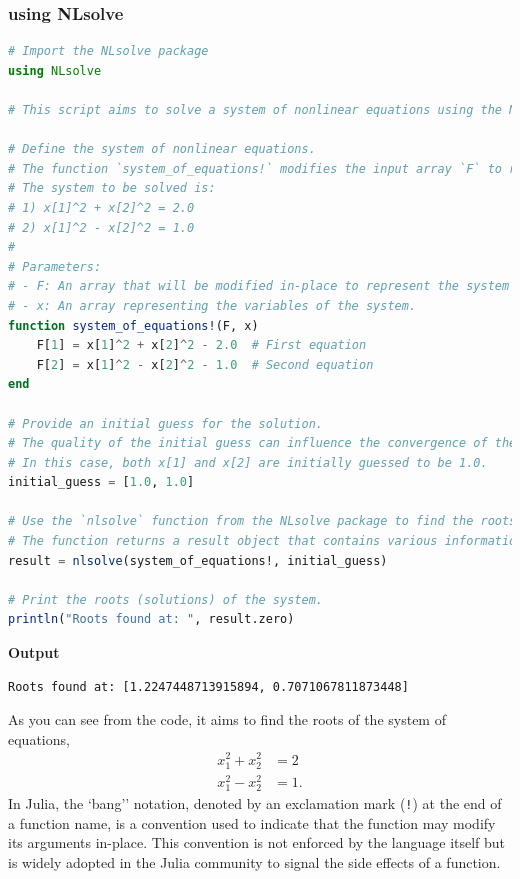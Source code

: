\subsubsection{using NLsolve}

\begin{lstlisting}[language=Julia,style=mystyle]
# Import the NLsolve package
using NLsolve

# This script aims to solve a system of nonlinear equations using the Newton-Raphson method provided by the NLsolve package.

# Define the system of nonlinear equations.
# The function `system_of_equations!` modifies the input array `F` to represent the system of equations.
# The system to be solved is:
# 1) x[1]^2 + x[2]^2 = 2.0
# 2) x[1]^2 - x[2]^2 = 1.0
# 
# Parameters:
# - F: An array that will be modified in-place to represent the system of equations.
# - x: An array representing the variables of the system.
function system_of_equations!(F, x)
    F[1] = x[1]^2 + x[2]^2 - 2.0  # First equation
    F[2] = x[1]^2 - x[2]^2 - 1.0  # Second equation
end

# Provide an initial guess for the solution. 
# The quality of the initial guess can influence the convergence of the Newton-Raphson method.
# In this case, both x[1] and x[2] are initially guessed to be 1.0.
initial_guess = [1.0, 1.0]

# Use the `nlsolve` function from the NLsolve package to find the roots of the system.
# The function returns a result object that contains various information about the solution process.
result = nlsolve(system_of_equations!, initial_guess)

# Print the roots (solutions) of the system.
println("Roots found at: ", result.zero)

\end{lstlisting}
\textbf{Output} 
\begin{verbatim}
Roots found at: [1.2247448713915894, 0.7071067811873448]
\end{verbatim}

\bigskip

As you can see from the code, it aims to find the roots of the system of equations,
\begin{align*}
x_1^2 + x_2^2 &= 2 \\
x_1^2 - x_2^2 &= 1.
\end{align*}
In Julia, the `bang'' notation, denoted by an exclamation mark (\texttt{!}) at the end of a function name, is a convention used to indicate that the function may modify its arguments in-place. This convention is not enforced by the language itself but is widely adopted in the Julia community to signal the side effects of a function. 

